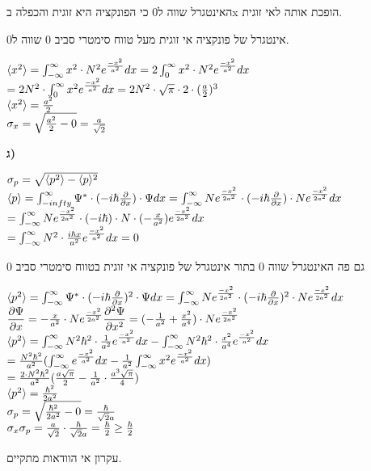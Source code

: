 \documentclass[14pt]{extarticle}
\makeatletter
\newenvironment{lefteqs}{%
    \begin{english}%
    \begin{flushleft}%
    \renewcommand{\arraystretch}{1.3}%
    $\begin{array}{@{}l@{}}%
}{%
    \end{array}$%
    \end{flushleft}%
    \end{english}%
}
\makeatother
\begin{document}
האינטגרל שווה ל0 כי הפונקציה היא זוגית והכפלה בx הופכת אותה לאי זוגית.

אינטגרל של פונקציה אי זוגית מעל טווח סימטרי סביב 0 שווה ל0.

\begin{lefteqs}
    \langle x^2 \rangle = \int_{-\infty}^{\infty} x^2 \cdot N^2 e^{\frac{-x^2}{a^2}} dx = 2 \int_{0}^{\infty} x^2 \cdot N^2 e^{\frac{-x^2}{a^2}} dx \\
    =2N^2 \cdot \int_{0}^{\infty} x^2 e^{\frac{-x^2}{a^2}} dx = 2N^2 \cdot \sqrt{\pi} \cdot 2 \cdot (\frac{a}{2})^3 \\
    \langle x^2 \rangle = \frac{a^2}{2} \\
    \sigma_x = \sqrt{\frac{a^2}{2} - 0} = \frac{a}{\sqrt{2}}
\end{lefteqs}

\textbf{ג)}
\begin{lefteqs}
    \sigma_p = \sqrt{\langle p^2 \rangle - \langle p \rangle^2} \\
    \langle p \rangle = \int_{-infty}^{\infty} \Psi^* \cdot (-i\hbar \frac{\partial}{\partial x}) \cdot \Psi dx = \int_{-\infty}^{\infty} N e^{\frac{-x^2}{2a^2}} \cdot (-i\hbar \frac{\partial}{\partial x}) \cdot N e^{\frac{-x^2}{2a^2}} dx \\
    = \int_{-\infty}^{\infty} N e^{\frac{-x^2}{2a^2}} \cdot (-i\hbar) \cdot N \cdot (-\frac{x}{a^2}) e^{\frac{-x^2}{2a^2}} dx \\
    = \int_{-\infty}^{\infty} N^2 \cdot \frac{i\hbar x}{a^2} e^{\frac{-x^2}{a^2}} dx = 0
\end{lefteqs}
גם פה האינטגרל שווה 0 בתור אינטגרל של פונקציה אי זוגית בטווח סימטרי סביב 0
\begin{lefteqs}
    \langle p^2 \rangle = \int_{-\infty}^{\infty} \Psi^* \cdot (-i\hbar \frac{\partial}{\partial x})^2 \cdot \Psi dx = \int_{-\infty}^{\infty} N e^{\frac{-x^2}{2a^2}} \cdot (-i\hbar \frac{\partial}{\partial x})^2 \cdot N e^{\frac{-x^2}{2a^2}} dx \\
    \dfrac{\partial \Psi}{\partial x} = -\frac{x}{a^2} \cdot N e^{\frac{-x^2}{2a^2}}
    \dfrac{\partial^2 \Psi}{\partial x^2} = (-\frac{1}{a^2} + \frac{x^2}{a^4}) \cdot N e^{\frac{-x^2}{2a^2}} \\
    \langle p^2 \rangle = \int_{-\infty}^{\infty} N^2 \hbar^2 \cdot \frac{1}{a^2} e^{\frac{-x^2}{a^2}} dx - \int_{-\infty}^{\infty} N^2 \hbar^2 \cdot \frac{x^2}{a^4} e^{\frac{-x^2}{a^2}} dx \\
    = \frac{N^2 \hbar^2}{a^2} ( \int_{-\infty}^{\infty} e^{\frac{-x^2}{a^2}} dx - \frac{1}{a^2}\int_{-\infty}^{\infty} x^2 e^{\frac{-x^2}{a^2}} dx ) \\
    = \frac{2 \cdot N^2 \hbar^2}{a^2} (\frac{a \sqrt{\pi}}{2} - \frac{1}{a^2} \cdot \frac{a^3 \sqrt{\pi}}{4}) \\
    \langle p^2 \rangle = \frac{\hbar^2}{2a^2} \\
    \sigma_p = \sqrt{\frac{\hbar^2}{2a^2} - 0} = \frac{\hbar}{\sqrt{2}a} \\
    \sigma_x \sigma_p = \frac{a}{\sqrt{2}} \cdot \frac{\hbar}{\sqrt{2}a} = \frac{\hbar}{2} \geq \frac{\hbar}{2} \\
\end{lefteqs}
עקרון אי הוודאות מתקיים.
\end{document}
